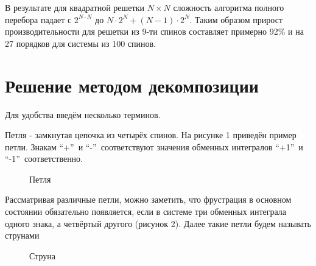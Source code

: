 \documentclass[utf8, babel, sor, jor, amsmath, amssymb, reprint]{elsarticle} %
\begin{document}
В результате для квадратной решетки $N \times N$ сложность алгоритма полного перебора падает с $2^{N \cdot N}$ до $N \cdot 2^N + (N - 1) \cdot 2^N$. Таким образом прирост производительности для решетки из 9-ти спинов составляет примерно 92\% и на 27 порядков для системы из 100 спинов.

\section{Решение методом декомпозиции}

Для удобства введём несколько терминов.

Петля - замкнутая цепочка из четырёх спинов. На рисунке 1 приведён пример петли. Знакам \textquotedblleft +\textquotedblright ~и   \textquotedblleft -\textquotedblright ~соответствуют значения обменных интегралов  \textquotedblleft +1\textquotedblright ~и \textquotedblleft -1\textquotedblright ~соответственно.

\begin{figure}[h]
	\centering
	\caption{Петля}
	\label{fig:petlya}
\end{figure}

Рассматривая различные петли, можно заметить, что фрустрация в основном состоянии обязательно появляется, если в системе три обменных интеграла одного знака, а четвёртый другого (рисунок 2). Далее такие петли будем называть струнами

\begin{figure}[h]
	\centering
	\caption{Струна}
	\label{fig:struna}
\end{figure}
\end{document}
